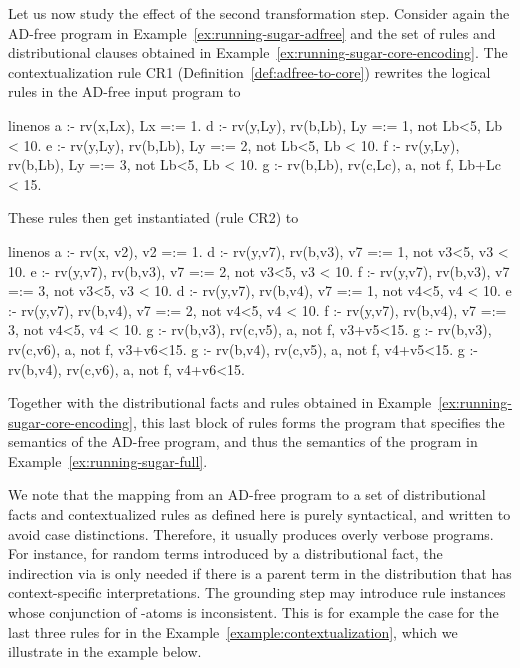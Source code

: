 \begin{example}
	\label{example:contextualization}
	Let us now study the effect of the second transformation step.
	Consider again the AD-free program in Example~\ref{ex:running-sugar-adfree} and the set of rules and distributional clauses obtained in Example~\ref{ex:running-sugar-core-encoding}.
	The contextualization rule CR1 (\cf Definition~\ref{def:adfree-to-core})  rewrites the logical rules in the AD-free input program to
	\begin{problog*}{linenos}
a :- rv(x,Lx), Lx =:= 1.
d :- rv(y,Ly), rv(b,Lb), Ly =:= 1, not Lb<5, Lb < 10.
e :- rv(y,Ly), rv(b,Lb), Ly =:= 2, not Lb<5, Lb < 10.
f :- rv(y,Ly), rv(b,Lb), Ly =:= 3, not Lb<5, Lb < 10.
g :- rv(b,Lb), rv(c,Lc), a, not f, Lb+Lc < 15.
	\end{problog*}
	These rules then get instantiated (rule CR2) to
	\begin{problog*}{linenos}
a :- rv(x, v2), v2 =:= 1.
d :- rv(y,v7), rv(b,v3), v7 =:= 1, not v3<5, v3 < 10.
e :- rv(y,v7), rv(b,v3), v7 =:= 2, not v3<5, v3 < 10.
f :- rv(y,v7), rv(b,v3), v7 =:= 3, not v3<5, v3 < 10.
d :- rv(y,v7), rv(b,v4), v7 =:= 1, not v4<5, v4 < 10.
e :- rv(y,v7), rv(b,v4), v7 =:= 2, not v4<5, v4 < 10.
f :- rv(y,v7), rv(b,v4), v7 =:= 3, not v4<5, v4 < 10.
g :- rv(b,v3), rv(c,v5), a, not f, v3+v5<15.
g :- rv(b,v3), rv(c,v6), a, not f, v3+v6<15.
g :- rv(b,v4), rv(c,v5), a, not f, v4+v5<15.
g :- rv(b,v4), rv(c,v6), a, not f, v4+v6<15.
	\end{problog*}
	Together with the distributional facts and rules obtained in Example~\ref{ex:running-sugar-core-encoding}, this last block of rules forms the \dcplpsty program that specifies the semantics of the AD-free \dcproblogsty program, and thus the semantics of the \dcproblogsty program in Example~\ref{ex:running-sugar-full}.
\end{example}




We note that the mapping from an AD-free program to a set of distributional facts and contextualized rules as defined here is purely syntactical, and written to avoid case distinctions.
Therefore, it usually produces overly verbose programs.
For instance, for random terms introduced by a distributional fact, the indirection via  is only needed if there is a parent term in the distribution that has context-specific interpretations.
The grounding step may introduce rule instances whose conjunction of -atoms is inconsistent.
This is for example the case for the last three rules for  in the Example~\ref{example:contextualization}, which we illustrate in the example below.


